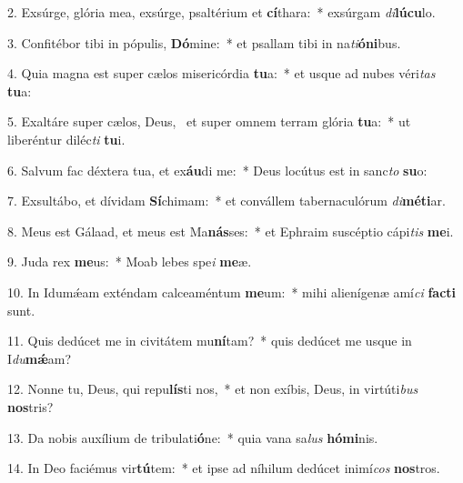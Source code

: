 2. Exsúrge, glória mea, exsúrge, psaltérium et \textbf{cí}thara:~*  exsúrgam \textit{di}\textbf{lú}\textbf{cu}lo.\

3. Confitébor tibi in pópulis, \textbf{Dó}mine:~*  et psallam tibi in na\textit{ti}\textbf{ó}\textbf{ni}bus.\

4. Quia magna est super cælos misericórdia \textbf{tu}a:~*  et usque ad nubes véri\textit{tas} \textbf{tu}a:\

5. Exaltáre super cælos, Deus, \dag\  et super omnem terram glória \textbf{tu}a:~*  ut liberéntur diléc\textit{ti} \textbf{tu}i.\

6. Salvum fac déxtera tua, et ex\textbf{áu}di me:~*  Deus locútus est in sanc\textit{to} \textbf{su}o:\

7. Exsultábo, et dívidam \textbf{Sí}chimam:~*  et convállem tabernaculórum \textit{di}\textbf{mé}\textbf{ti}ar.\

8. Meus est Gálaad, et meus est Ma\textbf{nás}ses:~*  et Ephraim suscéptio cápi\textit{tis} \textbf{me}i.\

9. Juda rex \textbf{me}us:~*  Moab lebes spe\textit{i} \textbf{me}æ.\

10. In Idumǽam exténdam calceaméntum \textbf{me}um:~*  mihi alienígenæ amí\textit{ci} \textbf{fac}\textbf{ti} sunt.\

11. Quis dedúcet me in civitátem mu\textbf{ní}tam?~*  quis dedúcet me usque in I\textit{du}\textbf{mǽ}am?\

12. Nonne tu, Deus, qui repu\textbf{lís}ti nos,~*  et non exíbis, Deus, in virtúti\textit{bus} \textbf{nos}tris?\

13. Da nobis auxílium de tribulati\textbf{ó}ne:~*  quia vana sa\textit{lus} \textbf{hó}\textbf{mi}nis.\

14. In Deo faciémus vir\textbf{tú}tem:~*  et ipse ad níhilum dedúcet inimí\textit{cos} \textbf{nos}tros.\

